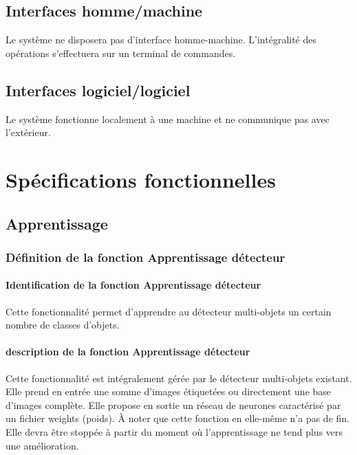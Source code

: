 \documentclass[debug,nodate,hideweeklyreports,noposter]{polytech/polytech}
\begin{document}
\section{Interfaces homme/machine}

Le système ne disposera pas d’interface homme-machine. L’intégralité des opérations s’effectuera sur un terminal de commandes.

\section{Interfaces logiciel/logiciel}

Le système fonctionne localement à une machine et ne communique pas avec l'extérieur.

\chapter{Spécifications fonctionnelles}
\label{ann:chap2}

\section{Apprentissage}

\subsection{Définition de la fonction Apprentissage détecteur}

\subsubsection{Identification de la fonction Apprentissage détecteur}

Cette fonctionnalité permet d’apprendre au détecteur multi-objets un certain nombre de classes d’objets.

\subsubsection{description de la fonction Apprentissage détecteur}

Cette fonctionnalité est intégralement gérée par le détecteur multi-objets existant. 
Elle prend en entrée une somme d’images étiquetées ou directement une base d’images complète. Elle propose en sortie un réseau de neurones caractérisé par un fichier weights (poids).
À noter que cette fonction en elle-même n’a pas de fin. Elle devra être stoppée à partir du moment où l’apprentissage ne tend plus vers une amélioration.
\end{document}
